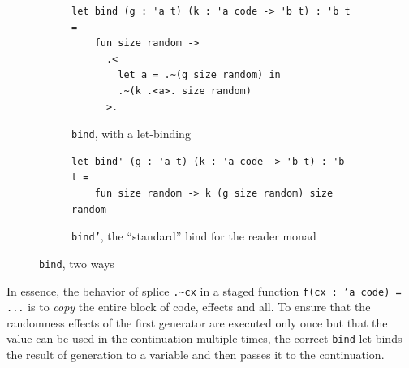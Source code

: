 \documentclass[acmsmall]{acmart}
\theoremstyle{definition}
\begin{document}
\begin{figure}[h]
  \begin{subfigure}{.45\textwidth}
\begin{lstlisting}[xleftmargin=0pt, xrightmargin=-3pt, aboveskip=0pt, belowskip=0pt]
let bind (g : 'a t) (k : 'a code -> 'b t) : 'b t =
    fun size random ->
      .<
        let a = .~(g size random) in
        .~(k .<a>. size random)
      >.
\end{lstlisting}
\caption{\texttt{bind}, with a let-binding}\label{fig:bind-with-let-binding}
  \end{subfigure}
  \begin{subfigure}{.45\textwidth}
\begin{lstlisting}[xleftmargin=0pt, xrightmargin=-27pt, aboveskip=0pt, belowskip=0pt]
let bind' (g : 'a t) (k : 'a code -> 'b t) : 'b t =
    fun size random -> k (g size random) size random
\end{lstlisting}
\caption{\texttt{bind'}, the ``standard'' bind for the reader monad}\label{fig:bind-without-let-binding}
  \end{subfigure}
  \caption{\texttt{bind}, two ways}
  \label{fig:bind-two-ways}
\end{figure}

In essence, the behavior of splice \texttt{.\~{}cx} in a staged function \texttt{f(cx : 'a code) = ...} is to \emph{copy}
the entire block of code, effects and all. To ensure that the randomness effects of the first generator are executed only once
but that the value can be used in the continuation multiple times, the correct \texttt{bind} let-binds the result of generation to a variable
and then passes it to the continuation.

\end{document}
